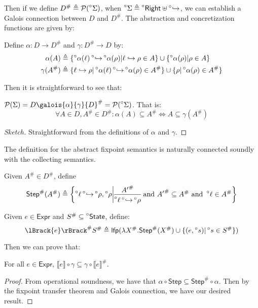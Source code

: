 \documentclass[acmsmall,screen,review]{acmart}\settopmatter{printfolios=true,printccs=false,printacmref=false}
\newcommand*{\pset}{\mathcal{P}}
\newcommand*{\A}[1]{\prescript{\circ}{}{#1}}
\newcommand*{\Abs}[1]{{#1}^{\#}}
\newcommand*{\Expr}{\mathsf{Expr}}
\newcommand*{\Right}{\mathsf{Right}}
\newcommand*{\State}{\mathsf{State}}
\newcommand*{\lfp}{\mathsf{lfp}}
\newcommand*{\Step}{\mathsf{Step}}
\newcommand*{\semarrow}{\hookrightarrow}
\newcommand*{\asemarrow}{\A{\hookrightarrow}}
\newcommand*{\sembracket}[1]{\lBrack{#1}\rBrack}
\begin{document}
Then if we define $\Abs{D}\triangleq\pset(\A\Sigma)$, when $\A\Sigma\triangleq\A\Right\uplus\A\semarrow$, we can establish a Galois connection between $D$ and $\Abs{D}$.
The abstraction and concretization functions are given by:
\begin{definition}
  Define $\alpha:D\rightarrow\Abs{D}$ and $\gamma:\Abs{D}\rightarrow D$ by:
  \begin{align*}
    \alpha(A)       & \triangleq\{\A\alpha(\ell)\asemarrow\A\alpha(\rho)|\ell\semarrow\rho\in A\}\cup\{\A\alpha(\rho)|\rho\in A\}           \\
    \gamma(\Abs{A}) & \triangleq\{\ell\semarrow\rho|\A\alpha(\ell)\asemarrow\A\alpha(\rho)\in\Abs{A}\}\cup\{\rho|\A\alpha(\rho)\in\Abs{A}\}
  \end{align*}
\end{definition}

Then it is straightforward to see that:
\begin{lemma}
  $\pset(\Sigma)=D\galois{\alpha}{\gamma}\Abs{D}=\pset(\A\Sigma)$. That is:
  \[\forall A\in D,\Abs{A}\in\Abs{D}:\alpha(A)\subseteq\Abs{A}\Leftrightarrow A\subseteq\gamma(\Abs{A})\]
\end{lemma}
\begin{proof}[Sketch]
  Straightforward from the definitions of $\alpha$ and $\gamma$.
\end{proof}

The definition for the abstract fixpoint semantics is naturally connected soundly with the collecting semantics.
\begin{definition}
  Given $\Abs{A}\in\Abs{D}$, define
  \[
    \Abs{\mathsf{Step}}(\Abs{A})\triangleq
    \left\{\A\ell\A\semarrow\A\rho, \A\rho\middle|
    \begin{prooftree}[center=true]
      \hypo{\Abs{A'}}\infer1{\A\ell\A\semarrow\A\rho}
    \end{prooftree}\text{ and }
    \Abs{A'}\subseteq \Abs{A}\text{ and }\A\ell\in\Abs{A}
    \right\}
  \]
\end{definition}
\begin{definition}
  Given $e\in\Expr$ and $\Abs{S}\subseteq\A\State$, define:
  \[
    \Abs{\sembracket{e}}\Abs{S}\triangleq\lfp(\lambda \Abs{X}.\Abs{\mathsf{Step}}(\Abs{X})\cup\{(e,\A{s})|\A{s}\in \Abs{S}\})
  \]
\end{definition}
Then we can prove that:
\begin{theorem}[Soundness]
  For all $e\in\Expr$, $\sembracket{e}\circ\gamma\subseteq\gamma\circ\Abs{\sembracket{e}}$.
\end{theorem}
\begin{proof}
  From operational soundness, we have that $\alpha\circ\Step\subseteq\Abs\Step\circ\alpha$.
  Then by the fixpoint transfer theorem and Galois connection, we have our desired result.
\end{proof}
\end{document}
